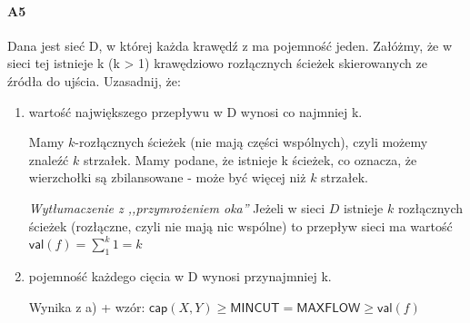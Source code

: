 \documentclass[a4paper,12pt]{article}
\theoremstyle{definition}%
\theoremstyle{definition}
\theoremstyle{problem}
\begin{document}
\paragraph{A5} Dana jest sieć D, w której każda krawędź z ma pojemność jeden. Załóżmy, że w sieci tej istnieje k
(k > 1) krawędziowo rozłącznych ścieżek skierowanych ze źródła do ujścia. Uzasadnij, że:
\begin{enumerate}[label=\alph*)]
\item wartość największego przepływu w D wynosi co najmniej k.

Mamy $k$-rozłącznych ścieżek (nie mają części wspólnych), czyli możemy znaleźć $k$ strzałek. Mamy podane, że istnieje k ścieżek, co oznacza, że wierzchołki są zbilansowane - może być więcej niż $k$ strzałek.

\textit{Wytłumaczenie z ,,przymrożeniem oka''}
Jeżeli w sieci $D$ istnieje $k$ rozłącznych ścieżek (rozłączne, czyli nie mają nic wspólne) to przepływ sieci ma wartość $\mathsf{val}(f)=\sum _1^k 1 = k$
\item pojemność każdego cięcia w D wynosi przynajmniej k.

Wynika z a) + wzór: $\mathsf{cap}(X,Y)\geq \mathsf{MINCUT}=\mathsf{MAXFLOW}\geq \mathsf{val}(f)$
\end{enumerate}
\end{document}
